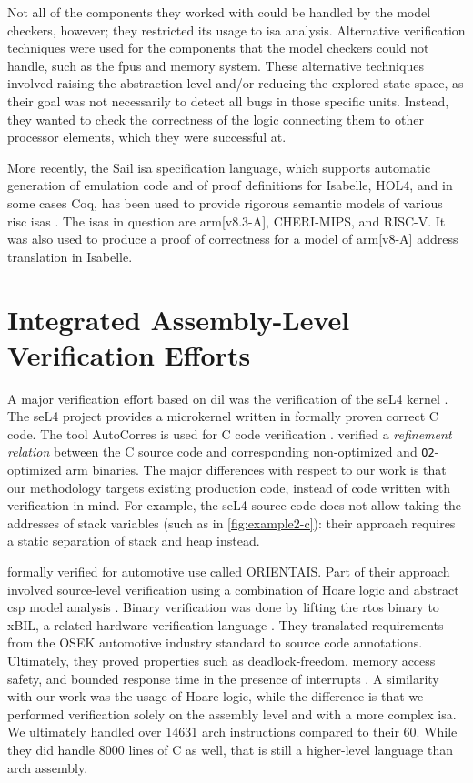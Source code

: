 Not all of the components they worked with could be handled by the model checkers,
however; they restricted its usage to \ac{isa} analysis.
Alternative verification techniques were used for the components that the model checkers
could not handle, such as the \acp{fpu} and memory system.
These alternative techniques involved raising the abstraction level
and/or reducing the explored state space,
as their goal was not necessarily to detect all bugs in those specific units.
Instead, they wanted to check the correctness of the logic connecting them
to other processor elements, which they were successful at.

More recently, the Sail \ac{isa} specification language,
which supports automatic generation of emulation code
and of proof definitions for Isabelle, HOL4, and in some cases Coq,
has been used to provide rigorous semantic models of various \ac{risc} \acp{isa}
\autocite{armstrong2018models,armstrong2019isa}.
The \acp{isa} in question are \gls{arm}[v8.3-A], CHERI-MIPS, and RISC-V.
It was also used to produce a proof of correctness for a model of
\gls{arm}[v8-A] address translation in Isabelle.

\section{Integrated Assembly-Level Verification Efforts}\label{se:integrated_assembly}
A major verification effort based on \acl{dil}
was the verification of the seL4 kernel \autocite{klein2009sel4,Klein_AEMSKH_14}.
The seL4 project provides a microkernel written in formally proven correct C code.
The tool AutoCorres is used for C code verification \autocite{greenaway2012bridging}.
\Textcite{sewell2013tvv} verified a \emph{refinement relation} between the C source code
and corresponding non-optimized and \lstinline|O2|-optimized \gls{arm} binaries.
The major differences with respect to our work
is that our methodology targets existing production code,
instead of code written with verification in mind.
For example, the seL4 source code does not allow taking the addresses of stack variables
(such as in \cref{fig:example2-c}):
their approach requires a static separation of stack and heap instead.

\Textcite{shi2012orientais} formally verified  for automotive use
called ORIENTAIS.
Part of their approach involved source-level verification
using a combination of Hoare logic
and abstract \ac{csp} model analysis \autocite{hoare1978csp}.
Binary verification was done by lifting the \ac{rtos} binary to xBIL,
a related hardware verification language \autocite{shi2012xbil}.
They translated requirements from the OSEK automotive industry standard
to source code annotations.
Ultimately, they proved properties such as deadlock-freedom, memory access safety,
and bounded response time in the presence of interrupts \autocite{shi2012interrupt}.
A similarity with our work was the usage of Hoare logic,
while the difference is that we performed verification solely on the assembly level
and with a more complex \ac{isa}.
We ultimately handled over \num{14631} \gls{arch} instructions compared to their \num{60}.
While they did handle \num{8000} lines of C as well,
that is still a higher-level language than \gls{arch} assembly.

